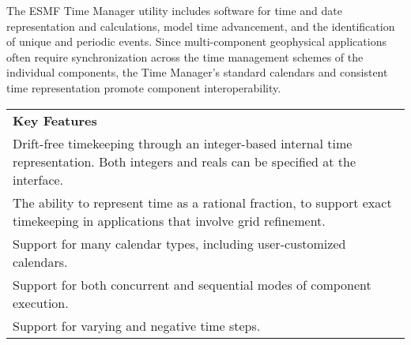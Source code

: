 
The ESMF Time Manager utility includes software for time and date 
representation and calculations, model time advancement, and the 
identification of unique and periodic events.  Since multi-component 
geophysical applications often require synchronization across
the time management schemes of the individual components, the 
Time Manager's standard calendars and consistent time representation 
promote component interoperability.
\begin{center}  
\begin{tabular}{|p{6in}|}
\hline
\vspace{.01in}
{\bf Key Features} \\[.01in]
Drift-free timekeeping through an integer-based internal time 
representation.  Both integers and reals can be specified at the interface. \\
The ability to represent time as a rational fraction, to support 
exact timekeeping in applications that involve grid refinement. \\
Support for many calendar types, including user-customized calendars. \\
Support for both concurrent and sequential modes of component execution. \\
Support for varying and negative time steps. \\[.03in] \hline
\end{tabular}
\end{center}

